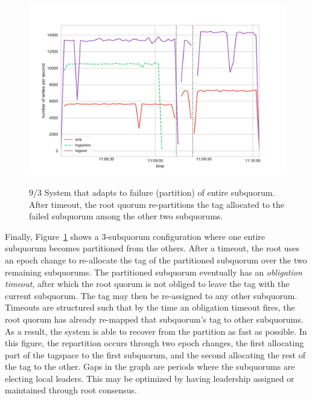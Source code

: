 \begin{figure}
    \begin{center}
        \includegraphics[width=5in]{figures/ch03_umd_fault_tolerance.pdf}
    \end{center}
    \renewcommand{\baselinestretch}{1}
    \small\normalsize

    \begin{quote}
        \caption[HC Fault Repartitioning]{9/3 System that adapts to failure (partition) of entire subquorum. After timeout, the root quorum re-partitions the tag allocated to the failed subquorum among the other two subquorums.}
        \label{fig:ch03_umd_fault_tolerance}
    \end{quote}
\end{figure}
\renewcommand{\baselinestretch}{2}
\small\normalsize

Finally, Figure~\ref{fig:ch03_umd_fault_tolerance} shows a 3-subquorum configuration where one entire subquorum becomes partitioned from the others.
After a timeout, the root uses an epoch change to re-allocate the tag of the partitioned subquorum over the two remaining subquorums.
The partitioned subquorum eventually has an \emph{obligation timeout}, after which the root quorum is not obliged to leave the tag with the current subquorum.
The tag may then be re-assigned to any other subquorum.
Timeouts are structured such that by the time an obligation timeout fires, the root quorum has already re-mapped that subquorum's tag to other subquorums.
As a result, the system is able to recover from the partition as fast as possible.
In this figure, the repartition occurs through two epoch changes, the first allocating part of the tagspace to the first subquorum, and the second allocating the rest of the tag to the other.
Gaps in the graph are periods where the subquorums are electing local leaders.
This may be optimized by having leadership assigned or maintained through root consensus.


